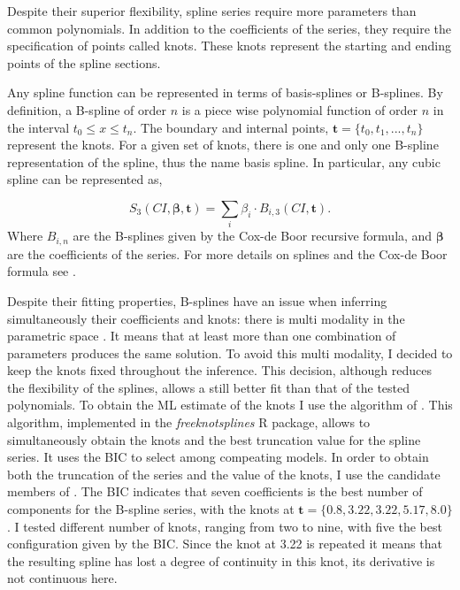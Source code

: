 Despite their superior flexibility, spline series require more parameters than common polynomials. In addition to the coefficients of the series, they require the specification of points called knots. These knots represent the starting and ending points of the spline sections. 

Any spline function can be represented in terms of basis-splines or B-splines. By definition, a B-spline of order $n$ is a piece wise polynomial function of order $n$ in the interval $t_0 \leq x \leq t_n$. The boundary and internal points, $\mathbf{t}=\{t_0,t_1,...,t_n\}$ represent the knots. For a given set of knots, there is one and only one B-spline representation of the spline, thus the name basis spline.  In particular, any cubic spline can be represented as,

\begin{equation}
S_3(CI,\boldsymbol{\beta},\mathbf{t}) = \sum_i \beta_i\cdot B_{i,3}(CI,\mathbf{t}).
\end{equation}
Where $B_{i,n}$ are the B-splines given by the Cox-de Boor recursive formula, and $\boldsymbol{\beta}$ are the coefficients of the series. For more details on splines and the Cox-de Boor formula see \citet{deBoor1978}.



Despite their fitting properties, B-splines have an issue when inferring simultaneously their coefficients and knots: there is multi modality in the parametric space \citep{Lindstrom1999}. It means that at least more than one combination of parameters produces the same solution. To avoid this multi modality, I decided to keep the knots fixed throughout the inference. This decision, although reduces the flexibility of the splines, allows a still better fit than that of the tested polynomials. To obtain the ML estimate of the knots I use the algorithm of  \citet{Spiriti2013}. This algorithm, implemented in the \emph{freeknotsplines} R package, allows to simultaneously obtain the knots and the best truncation value for the spline series. It uses the BIC to select among compeating models. In order to obtain both the truncation of the series and the value of the knots, I use the candidate members of \citet{Bouy2015}. The BIC indicates that seven coefficients is the best number of components for the B-spline series, with the knots at $\mathbf{t}=\{0.8,3.22,3.22,5.17,8.0\}$. I tested different number of knots, ranging from two to nine, with five the best configuration given by the BIC. Since the knot at 3.22 is repeated it means that the resulting spline has lost a degree of continuity in this knot, its derivative is not continuous here.

